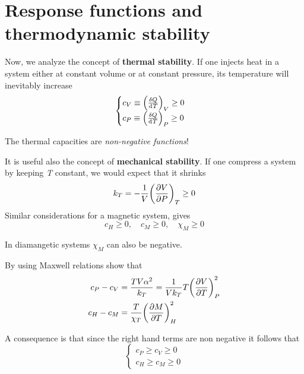 \documentclass[../main/main.tex]{subfiles}
\begin{document}
\section{Response functions and thermodynamic stability}
Now, we analyze the concept of \textbf{thermal stability}. If one injects heat in a system either at constant volume or at constant pressure, its temperature will inevitably increase
\begin{equation}
  \begin{cases}
   c_V \equiv \qty(\frac{\delta Q}{\dd[]{T} })_V \ge 0  \\
   c_P \equiv \qty(\frac{\delta Q}{\dd[]{T} })_P \ge 0
  \end{cases}
\label{eq:}
\end{equation}
\begin{remark}
The thermal capacities are \emph{non-negative functions}!
\end{remark}
It is useful also the concept of \textbf{mechanical stability}. If one compress a system by keeping \emph{T} constant, we would expect that it shrinks
\begin{equation}
  k_T = - \frac{1}{V} \qty(\pdv{V}{P} )_T \ge 0
  \label{eq:}
\end{equation}
Similar considerations for a magnetic system, gives
\begin{equation}
  c_H \ge 0, \quad c_M \ge 0, \quad \chi_M \ge 0
  \label{eq:}
\end{equation}
\begin{remark}
In diamangetic systems \( \chi_M \) can also be negative.
\end{remark}

\begin{exercise}
By using Maxwell relations show that
\begin{subequations}
\begin{align}
  c_P - c_V &= \frac{T V \alpha ^2}{k_T} = \frac{1}{V k_T} T \qty(\pdv{V}{T} )_P^2 \\
  c_H - c_M &= \frac{T}{\chi _T} \qty(\pdv{M}{T} )_H^2
\end{align}
\label{}
\end{subequations}
\end{exercise}
\noindent A consequence is that since the right hand terms are non negative it follows that
\begin{equation}
  \begin{cases}
   c_P \ge c_V \ge 0  \\
   c_H \ge c_M \ge 0
  \end{cases}
\label{eq:}
\end{equation}
\end{document}
